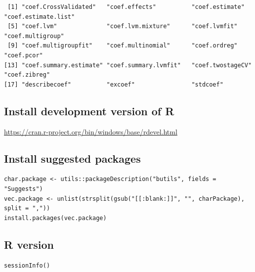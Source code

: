 \documentclass{article}
\begin{document}
\begin{verbatim}
 [1] "coef.CrossValidated"   "coef.effects"          "coef.estimate"         "coef.estimate.list"   
 [5] "coef.lvm"              "coef.lvm.mixture"      "coef.lvmfit"           "coef.multigroup"      
 [9] "coef.multigroupfit"    "coef.multinomial"      "coef.ordreg"           "coef.pcor"            
[13] "coef.summary.estimate" "coef.summary.lvmfit"   "coef.twostageCV"       "coef.zibreg"          
[17] "describecoef"          "excoef"                "stdcoef"
\end{verbatim}

\subsection{Install development version of R}
\label{sec:org0ca9586}
\url{https://cran.r-project.org/bin/windows/base/rdevel.html}

\subsection{Install suggested packages}
\label{sec:org5a30e14}

\lstset{language=r,label= ,caption= ,captionpos=b,numbers=none}
\begin{lstlisting}
char.package <- utils::packageDescription("butils", fields = "Suggests")
vec.package <- unlist(strsplit(gsub("[[:blank:]]", "", charPackage), split = ","))
install.packages(vec.package)
\end{lstlisting}

\subsection{R version}
\label{sec:org4727a00}

\lstset{language=r,label= ,caption= ,captionpos=b,numbers=none}
\begin{lstlisting}
sessionInfo()
\end{lstlisting}
\end{document}
